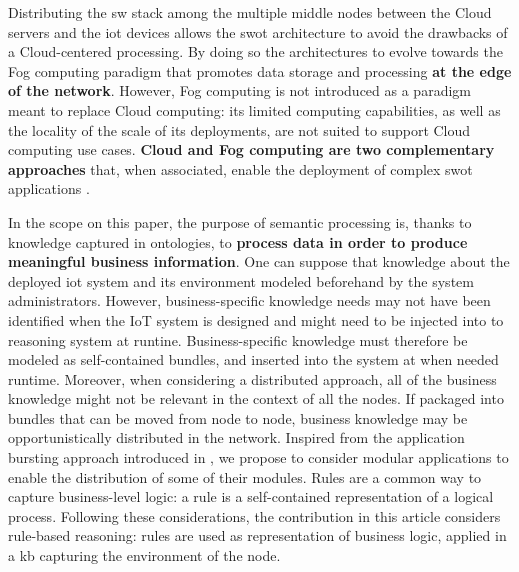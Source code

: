 \documentclass{iosart2c}
\begin{document}
Distributing the \gls{sw} stack among the multiple middle nodes between the Cloud servers and the \gls{iot} devices allows the \gls{swot} architecture to avoid the drawbacks of a Cloud-centered processing.
By doing so the architectures to evolve towards the Fog computing paradigm \cite{Bonomi2012} that promotes data storage and processing \textbf{at the edge of the network}\cite{Patel2017}.
However, Fog computing is not introduced as a paradigm meant to replace Cloud computing: its limited computing capabilities, as well as the locality of the scale of its deployments, are not suited to support Cloud computing use cases.
\textbf{Cloud and Fog computing are two complementary approaches} that, when associated, enable the deployment of complex \gls{swot} applications \cite{Sahni2017}.

In the scope on this paper, the  purpose of semantic processing is, thanks to knowledge captured in ontologies, to \textbf{process data in order to produce meaningful business information}. 
One can suppose that knowledge about the deployed \gls{iot} system and its environment modeled beforehand by the system administrators.
However, business-specific knowledge needs may not have been identified when the IoT system is designed and might need to be injected into to reasoning system at runtine.
Business-specific knowledge must therefore be modeled as self-contained bundles, and inserted into the system at when needed runtime.
Moreover, when considering a distributed approach, all of the business knowledge might not be relevant in the context of all the nodes. 
If packaged into bundles that can be moved from node to node, business knowledge may be opportunistically distributed in the network. 
Inspired from the application bursting approach introduced in \cite{Charrada2016}, we propose to consider modular applications to enable the distribution of some of their modules.
Rules are a common way to capture business-level logic: a rule is a self-contained representation of a logical process.
Following these considerations, the contribution in this article considers rule-based reasoning: rules are used as representation of business logic, applied in a \gls{kb} capturing the environment of the node.
\end{document}
